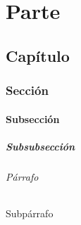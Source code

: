 \part{Parte}                  %

\chapter{Capítulo}            %

\section{Sección}             %

\subsection{Subsección}       %

\subsubsection{Subsubsección} %

\paragraph{Párrafo}           %

\subparagraph{Subpárrafo}     %
